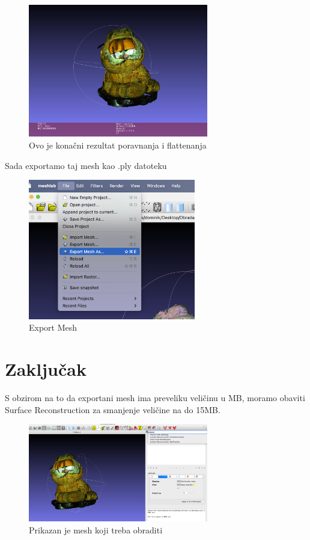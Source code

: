 \documentclass[12pt]{article} %
\begin{document}
		\begin{figure}[H]
			\centering
			\includegraphics[width=0.7\textwidth]{screenshots/18.png}
			\caption{Ovo je konačni rezultat poravnanja i flattenanja}
			\label{fig:yourlabel}
		\end{figure}
				Sada exportamo taj mesh kao .ply datoteku
		\begin{figure}[H]
			\centering
			\includegraphics[width=0.65\textwidth]{screenshots/19.png}
			\caption{Export Mesh}
			\label{fig:yourlabel}
		\end{figure}
		
	\eject
	
	\pagebreak
	\section{Zaključak}
	S obzirom na to da exportani mesh ima preveliku veličinu u MB, moramo obaviti Surface Reconstruction za smanjenje veličine na do 15MB.

		\begin{figure}[H]
			\centering
			\includegraphics[width=0.7\textwidth]{screenshots/20.png}
			\caption{Prikazan je mesh koji treba obraditi}
			\label{fig:yourlabel2}
		\end{figure}
		
\end{document}
